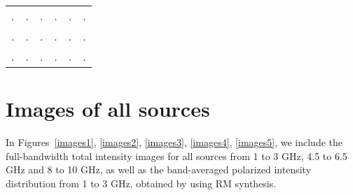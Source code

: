 \documentclass{mnras}
\begin{document}
\begin{table*}
\begin{tabular}{lccccc}
.  &   .  &   .  &   .  &   .  &   . \\
.  &   .  &   .  &   .  &   .  &   . \\
.  &   .  &   .  &   .  &   .  &   . \\
		\hline
	\end{tabular}
\end{table*}



\section{Images of all sources}
\label{sec:images}
In Figures~\ref{images1}, \ref{images2}, \ref{images3}, \ref{images4}, \ref{images5}, we include the full-bandwidth total intensity images for all sources from 1 to 3 GHz, 4.5 to 6.5 GHz and 8 to 10 GHz, as well as the band-averaged polarized intensity distribution from 1 to 3 GHz, obtained by using RM synthesis.
\end{document}
